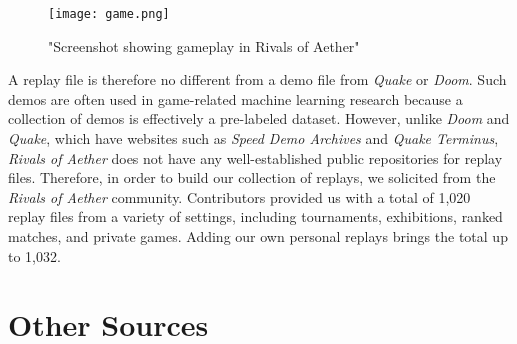 \begin{figure}
	\caption{"Screenshot showing gameplay in Rivals of Aether"}
	\centering
	\texttt{[image: game.png]} \\
\end{figure}

A replay file is therefore no different from a demo file from {\it Quake} or {\it Doom}. Such demos are often used in game-related machine learning research because a collection of demos is effectively a pre-labeled dataset. However, unlike {\it Doom} and {\it Quake}, which have websites such as {\it Speed Demo Archives} and {\it Quake Terminus}, {\it Rivals of Aether} does not have any well-established public repositories for replay files. Therefore, in order to build our collection of replays, we solicited from the {\it Rivals of Aether} community. Contributors provided us with a total of 1,020 replay files from a variety of settings, including tournaments, exhibitions, ranked matches, and private games. Adding our own personal replays brings the total up to 1,032. 




\section{Other Sources}



